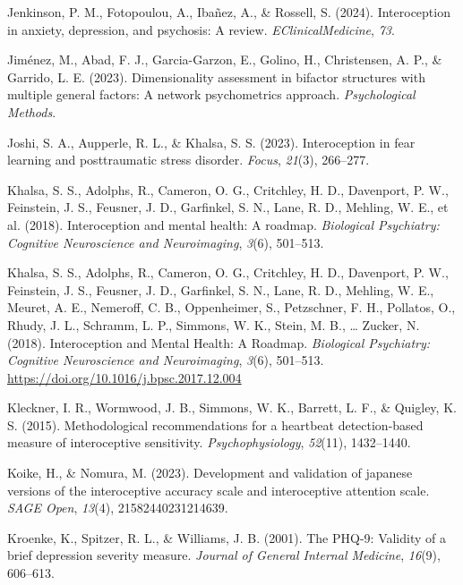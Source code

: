 \documentclass[
  jou,
  floatsintext,
  longtable,
  nolmodern,
  notxfonts,
  notimes,
  colorlinks=true,linkcolor=blue,citecolor=blue,urlcolor=blue]{apa7}
\newlength{\cslhangindent}
\newenvironment{CSLReferences}[2] %
 {\begin{list}{}{%
  \setlength{\itemindent}{0pt}
  \setlength{\leftmargin}{0pt}
  \setlength{\parsep}{0pt}
  \ifodd #1
   \setlength{\leftmargin}{\cslhangindent}
   \setlength{\itemindent}{-1\cslhangindent}
  \fi
  \setlength{\itemsep}{#2\baselineskip}}}
 {\end{list}}
\begin{document}
\begin{CSLReferences}{1}{0}
Jenkinson, P. M., Fotopoulou, A., Ibañez, A., \& Rossell, S. (2024).
Interoception in anxiety, depression, and psychosis: A review.
\emph{EClinicalMedicine}, \emph{73}.

Jiménez, M., Abad, F. J., Garcia-Garzon, E., Golino, H., Christensen, A.
P., \& Garrido, L. E. (2023). Dimensionality assessment in bifactor
structures with multiple general factors: A network psychometrics
approach. \emph{Psychological Methods}.

Joshi, S. A., Aupperle, R. L., \& Khalsa, S. S. (2023). Interoception in
fear learning and posttraumatic stress disorder. \emph{Focus},
\emph{21}(3), 266--277.

Khalsa, S. S., Adolphs, R., Cameron, O. G., Critchley, H. D., Davenport,
P. W., Feinstein, J. S., Feusner, J. D., Garfinkel, S. N., Lane, R. D.,
Mehling, W. E., et al. (2018). Interoception and mental health: A
roadmap. \emph{Biological Psychiatry: Cognitive Neuroscience and
Neuroimaging}, \emph{3}(6), 501--513.

Khalsa, S. S., Adolphs, R., Cameron, O. G., Critchley, H. D., Davenport,
P. W., Feinstein, J. S., Feusner, J. D., Garfinkel, S. N., Lane, R. D.,
Mehling, W. E., Meuret, A. E., Nemeroff, C. B., Oppenheimer, S.,
Petzschner, F. H., Pollatos, O., Rhudy, J. L., Schramm, L. P., Simmons,
W. K., Stein, M. B., \ldots{} Zucker, N. (2018). Interoception and
Mental Health: A Roadmap. \emph{Biological Psychiatry: Cognitive
Neuroscience and Neuroimaging}, \emph{3}(6), 501--513.
\url{https://doi.org/10.1016/j.bpsc.2017.12.004}

Kleckner, I. R., Wormwood, J. B., Simmons, W. K., Barrett, L. F., \&
Quigley, K. S. (2015). Methodological recommendations for a heartbeat
detection-based measure of interoceptive sensitivity.
\emph{Psychophysiology}, \emph{52}(11), 1432--1440.

Koike, H., \& Nomura, M. (2023). Development and validation of japanese
versions of the interoceptive accuracy scale and interoceptive attention
scale. \emph{SAGE Open}, \emph{13}(4), 21582440231214639.

Kroenke, K., Spitzer, R. L., \& Williams, J. B. (2001). The PHQ-9:
Validity of a brief depression severity measure. \emph{Journal of
General Internal Medicine}, \emph{16}(9), 606--613.


\end{CSLReferences}
\end{document}
